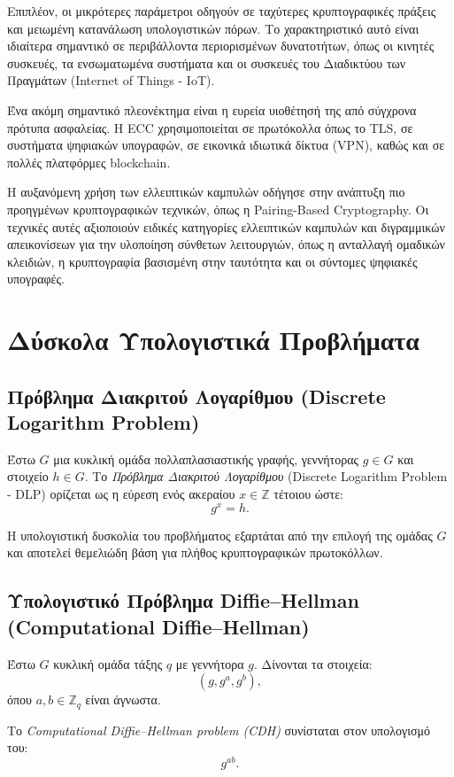 \documentclass[12pt,a4paper]{report}
\begin{document}
Επιπλέον, οι μικρότερες παράμετροι οδηγούν σε ταχύτερες κρυπτογραφικές
πράξεις και μειωμένη κατανάλωση υπολογιστικών πόρων. Το χαρακτηριστικό αυτό
είναι ιδιαίτερα σημαντικό σε περιβάλλοντα περιορισμένων δυνατοτήτων, όπως οι
κινητές συσκευές, τα ενσωματωμένα συστήματα και οι συσκευές του Διαδικτύου
των Πραγμάτων (Internet of Things - IoT).

Ένα ακόμη σημαντικό πλεονέκτημα είναι η ευρεία υιοθέτησή της από σύγχρονα
πρότυπα ασφαλείας. Η ECC χρησιμοποιείται σε πρωτόκολλα όπως το TLS,
σε συστήματα ψηφιακών υπογραφών, σε εικονικά ιδιωτικά δίκτυα (VPN),
καθώς και σε πολλές πλατφόρμες blockchain.

Η αυξανόμενη χρήση των ελλειπτικών καμπυλών οδήγησε στην ανάπτυξη πιο
προηγμένων κρυπτογραφικών τεχνικών, όπως η Pairing-Based Cryptography.
Οι τεχνικές αυτές αξιοποιούν ειδικές κατηγορίες ελλειπτικών καμπυλών και
διγραμμικών απεικονίσεων για την υλοποίηση σύνθετων λειτουργιών, όπως
η ανταλλαγή ομαδικών κλειδιών, η κρυπτογραφία βασισμένη στην ταυτότητα
και οι σύντομες ψηφιακές υπογραφές.


\section{Δύσκολα Υπολογιστικά Προβλήματα}

\subsection{Πρόβλημα Διακριτού Λογαρίθμου (Discrete Logarithm Problem)}

Έστω $G$ μια κυκλική ομάδα πολλαπλασιαστικής γραφής, γεννήτορας $g \in G$ και στοιχείο $h \in G$. 
Το \textit{Πρόβλημα Διακριτού Λογαρίθμου} (Discrete Logarithm Problem - DLP) ορίζεται ως η εύρεση ενός ακεραίου $x \in \mathbb{Z}$ τέτοιου ώστε:
\[
g^x = h.
\]

Η υπολογιστική δυσκολία του προβλήματος εξαρτάται από την επιλογή της ομάδας $G$ και αποτελεί θεμελιώδη βάση για πλήθος κρυπτογραφικών πρωτοκόλλων.

\subsection{Υπολογιστικό Πρόβλημα Diffie--Hellman (Computational Diffie--Hellman)}

Έστω $G$ κυκλική ομάδα τάξης $q$ με γεννήτορα $g$. Δίνονται τα στοιχεία:
\[
(g, g^a, g^b),
\]
όπου $a,b \in \mathbb{Z}_q$ είναι άγνωστα.

Το \textit{Computational Diffie--Hellman problem (CDH)} συνίσταται στον υπολογισμό του:
\[
g^{ab}.
\]
\end{document}
